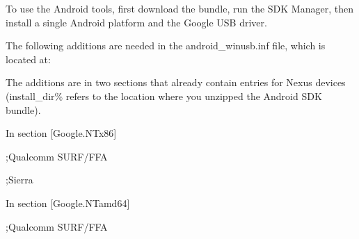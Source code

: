 To use the Android tools, first download the bundle, run the S\+D\+K Manager, then install a single Android platform and the Google U\+S\+B driver.

The following additions are needed in the android\+\_\+winusb.\+inf file, which is located at\+: 
\begin{DoxyCode}
\end{DoxyCode}


The additions are in two sections that already contain entries for Nexus devices (install\+\_\+dir\% refers to the location where you unzipped the Android S\+D\+K bundle).

\begin{DoxyVerb}In section [Google.NTx86]

;Qualcomm SURF/FFA


;Sierra

In section [Google.NTamd64]

;Qualcomm SURF/FFA



\end{DoxyVerb}
